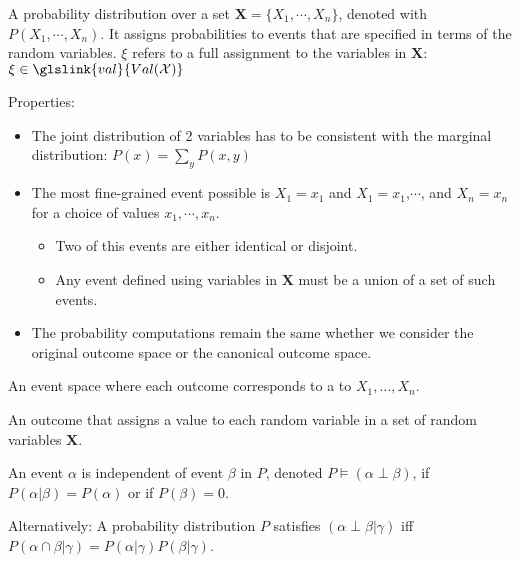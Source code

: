{%
  A \gls{probability distribution} over a set $\bm{X}=\{X_1,\cdots,X_n\}$, denoted with $P(X_1,\cdots,X_n)$. It assigns probabilities to events that are specified in terms of the \glspl{random variable}. $\xi$ refers to a full assignment to the variables in $\bm{X}$: $\xi\in\glslink{val}{Val(\mathcal{X})}$

  Properties:
  \begin{itemize}
    \item The joint distribution of 2 variables has to be consistent with the \gls{marginal distribution}: $P(x)=\sum_{y}P(x,y)$
    \item The most fine-grained event possible is $X_1=x_1$ and $X_1=x_1$,$\cdots$, and $X_n=x_n$ for a choice of values $x_1,\cdots,x_n$.
    \begin{itemize}
      \item Two of this events are either identical or disjoint.
      \item Any event defined using variables in $\bm{X}$ must be a union of a set of such events.
    \end{itemize}
    \item The probability computations remain the same whether we consider the original outcome space or the \gls{canonical outcome space}.
  \end{itemize}

}

{%
  An \gls{event space} where each outcome corresponds to a  to $X_1,\dots, X_n$.
}

{%
  An outcome that assigns a value to each \gls{random variable} in a set of random variables $\bm{X}$.
}

{%
  An event $\alpha$ is independent of event $\beta$ in $P$, denoted $P\models(\alpha\perp\beta)$, if $P(\alpha|\beta)=P(\alpha)$ or if $P(\beta)=0$.

  Alternatively: A \gls{probability distribution} $P$ satisfies $(\alpha\perp\beta|\gamma)$ \acrshort{iff} $P(\alpha\cap\beta|\gamma)=P(\alpha|\gamma)P(\beta|\gamma)$.
}

